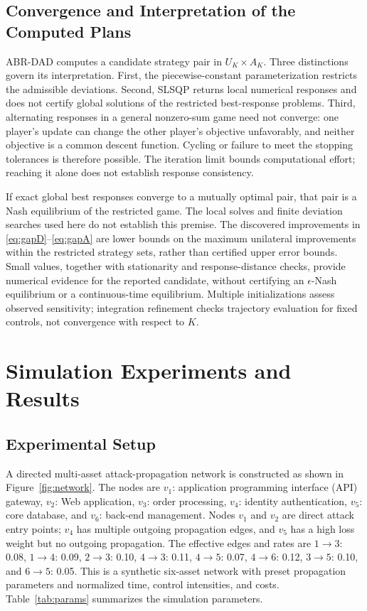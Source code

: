 \documentclass[conference,letterpaper]{IEEEtran}
\begin{document}
\subsection{Convergence and Interpretation of the Computed Plans}
ABR-DAD computes a candidate strategy pair in $U_K\times A_K$. Three distinctions govern its interpretation. First, the piecewise-constant parameterization restricts the admissible deviations. Second, SLSQP returns local numerical responses and does not certify global solutions of the restricted best-response problems. Third, alternating responses in a general nonzero-sum game need not converge: one player's update can change the other player's objective unfavorably, and neither objective is a common descent function. Cycling or failure to meet the stopping tolerances is therefore possible. The iteration limit bounds computational effort; reaching it alone does not establish response consistency.

If exact global best responses converge to a mutually optimal pair, that pair is a Nash equilibrium of the restricted game. The local solves and finite deviation searches used here do not establish this premise. The discovered improvements in \eqref{eq:gapD}--\eqref{eq:gapA} are lower bounds on the maximum unilateral improvements within the restricted strategy sets, rather than certified upper error bounds. Small values, together with stationarity and response-distance checks, provide numerical evidence for the reported candidate, without certifying an $\epsilon$-Nash equilibrium or a continuous-time equilibrium. Multiple initializations assess observed sensitivity; integration refinement checks trajectory evaluation for fixed controls, not convergence with respect to $K$.

\section{Simulation Experiments and Results}
\subsection{Experimental Setup}
A directed multi-asset attack-propagation network is constructed as shown in Figure~\ref{fig:network}. The nodes are $v_1$: application programming interface (API) gateway, $v_2$: Web application, $v_3$: order processing, $v_4$: identity authentication, $v_5$: core database, and $v_6$: back-end management. Nodes $v_1$ and $v_2$ are direct attack entry points; $v_4$ has multiple outgoing propagation edges, and $v_5$ has a high loss weight but no outgoing propagation. The effective edges and rates are $1\!\to\!3$: 0.08, $1\!\to\!4$: 0.09, $2\!\to\!3$: 0.10, $4\!\to\!3$: 0.11, $4\!\to\!5$: 0.07, $4\!\to\!6$: 0.12, $3\!\to\!5$: 0.10, and $6\!\to\!5$: 0.05. This is a synthetic six-asset network with preset propagation parameters and normalized time, control intensities, and costs. Table~\ref{tab:params} summarizes the simulation parameters.
\end{document}
